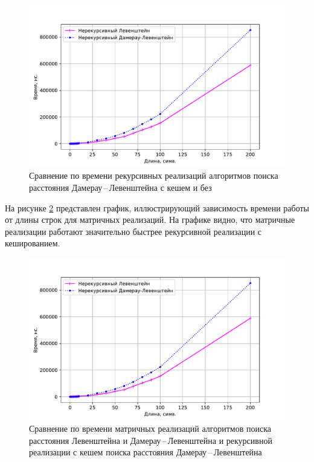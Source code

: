 \begin{figure}[h]
	\centering
	\includegraphics[height=0.5\textheight, page=2]{img/figures.pdf}
	\caption{Сравнение по времени рекурсивных реализаций алгоритмов поиска расстояния Дамерау\,--\,Левенштейна с кешем и без}
	\label{plt:time_02}
\end{figure}

На рисунке \ref{plt:time_03} представлен график, иллюстрирующий зависимость времени работы от длины строк для матричных реализаций. На графике видно, что матричные реализации работают значительно быстрее рекурсивной реализации с кешированием. 

\begin{figure}[h]
	\centering
	\includegraphics[height=0.5\textheight, page=3]{img/figures.pdf}
	\caption{Сравнение по времени матричных реализаций алгоритмов поиска расстояния Левенштейна и Дамерау\,--\,Левенштейна и рекурсивной реализации с кешем поиска расстояния Дамерау\,--\,Левенштейна}
	\label{plt:time_03}
\end{figure}

